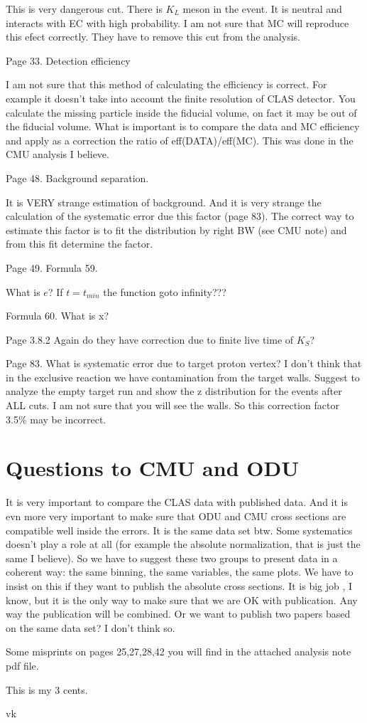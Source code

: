 \documentclass[11pt]{amsart}
\begin{document}
This is very dangerous cut. There is $K_L$  meson in the event. It is neutral and interacts with EC with high probability. I am not sure that MC will reproduce this efect correctly.  They have to remove this cut from the analysis.

Page 33. Detection efficiency

I am not sure that this method of calculating the efficiency is correct. For example it doesn't take into account the finite resolution of CLAS detector. You calculate the missing particle inside the fiducial  volume, on fact it may be out of the fiducial volume. What is important is to compare the data and MC efficiency and apply  as a correction the ratio of eff(DATA)/eff(MC). This was done in the CMU analysis I believe.

Page 48. Background separation.

It is VERY strange estimation of background. And it is very strange the calculation of the systematic error due
this factor (page 83). The correct way to estimate this factor is to fit the distribution by right BW (see CMU note) and from this fit determine the factor.

Page 49. Formula 59.

What is $e$? If $t=t_{min}$ the function goto infinity???

Formula 60. What is x? 

Page 3.8.2 Again do they have correction due to finite live time of $K_S$?

Page 83. What is systematic error due to target proton vertex? I don't think that in the exclusive reaction we have contamination from the target walls. Suggest to analyze the empty target run and show the z distribution for the events after ALL cuts. I am not sure that you will see the walls. So this correction factor 3.5\% may be incorrect.

\section{Questions to CMU and ODU}

It is very important to compare the CLAS data with published data. And it is evn more very important to
make sure that ODU and CMU cross sections are compatible well inside the errors. It is the same data set btw. Some systematics doesn't play a role at all (for example the absolute normalization, that is just the same I believe). So we have to suggest these two groups to present data in a coherent way: the same binning, the same variables, the same plots. We have to insist on this if they want to publish the absolute cross sections.
It is big job , I know, but it is the only way to make sure that we are OK with publication. Any way the publication will be combined. Or we want to publish two papers based on the same data set?
I don't think so.

Some misprints on pages 25,27,28,42 you will find in the attached analysis note pdf file.

This is my 3 cents.

vk

   

 
\end{document}
